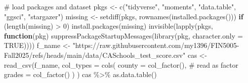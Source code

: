 \documentclass[
  12pt,
  letterpaper,
]{scrbook}
\newenvironment{Shaded}{\begin{snugshade}}{\end{snugshade}}
\newcommand{\AttributeTok}[1]{\textcolor[rgb]{0.40,0.45,0.13}{#1}}
\newcommand{\CommentTok}[1]{\textcolor[rgb]{0.37,0.37,0.37}{#1}}
\newcommand{\ConstantTok}[1]{\textcolor[rgb]{0.56,0.35,0.01}{#1}}
\newcommand{\ControlFlowTok}[1]{\textcolor[rgb]{0.00,0.23,0.31}{\textbf{#1}}}
\newcommand{\DecValTok}[1]{\textcolor[rgb]{0.68,0.00,0.00}{#1}}
\newcommand{\FunctionTok}[1]{\textcolor[rgb]{0.28,0.35,0.67}{#1}}
\newcommand{\NormalTok}[1]{\textcolor[rgb]{0.00,0.23,0.31}{#1}}
\newcommand{\OtherTok}[1]{\textcolor[rgb]{0.00,0.23,0.31}{#1}}
\newcommand{\SpecialCharTok}[1]{\textcolor[rgb]{0.37,0.37,0.37}{#1}}
\newcommand{\StringTok}[1]{\textcolor[rgb]{0.13,0.47,0.30}{#1}}
\theoremstyle{plain}
\theoremstyle{definition}
\theoremstyle{remark}
\begin{document}
\begin{Shaded}
\begin{Highlighting}[]
\CommentTok{\# load packages and dataset}
\NormalTok{pkgs }\OtherTok{\textless{}{-}} \FunctionTok{c}\NormalTok{(}\StringTok{"tidyverse"}\NormalTok{, }\StringTok{"moments"}\NormalTok{, }\StringTok{"data.table"}\NormalTok{, }\StringTok{"ggsci"}\NormalTok{, }\StringTok{"stargazer"}\NormalTok{)}
\NormalTok{missing }\OtherTok{\textless{}{-}} \FunctionTok{setdiff}\NormalTok{(pkgs, }\FunctionTok{rownames}\NormalTok{(}\FunctionTok{installed.packages}\NormalTok{()))}
\ControlFlowTok{if}\NormalTok{ (}\FunctionTok{length}\NormalTok{(missing) }\SpecialCharTok{\textgreater{}} \DecValTok{0}\NormalTok{) }\FunctionTok{install.packages}\NormalTok{(missing)}
\FunctionTok{invisible}\NormalTok{(}\FunctionTok{lapply}\NormalTok{(pkgs, }\ControlFlowTok{function}\NormalTok{(pkg) }\FunctionTok{suppressPackageStartupMessages}\NormalTok{(}\FunctionTok{library}\NormalTok{(pkg, }\AttributeTok{character.only =} \ConstantTok{TRUE}\NormalTok{))))}
\NormalTok{f\_name }\OtherTok{\textless{}{-}} \StringTok{"https://raw.githubusercontent.com/my1396/FIN5005{-}Fall2025/refs/heads/main/data/CASchools\_test\_score.csv"}
\NormalTok{cas }\OtherTok{\textless{}{-}} \FunctionTok{read\_csv}\NormalTok{(f\_name,}
    \AttributeTok{col\_types =} \FunctionTok{cols}\NormalTok{(}
        \AttributeTok{county =} \FunctionTok{col\_factor}\NormalTok{(), }\CommentTok{\# read as factor}
        \AttributeTok{grades =} \FunctionTok{col\_factor}\NormalTok{()}
\NormalTok{    )}
\NormalTok{)}
\NormalTok{cas }\SpecialCharTok{\%\textgreater{}\%} \FunctionTok{as.data.table}\NormalTok{()}
\end{Highlighting}
\end{Shaded}
\end{document}
